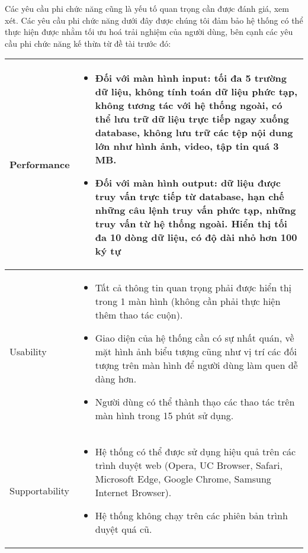 Các yêu cầu phi chức năng cũng là yếu tố quan trọng cần được đánh giá, xem xét.
Các yêu cầu phi chức năng dưới đây được chúng tôi đảm bảo hệ thống có thể thực
hiện được nhằm tối ưu hoá trải nghiệm của người dùng, bên cạnh các yêu cầu phi
chức năng kế thừa từ đề tài trước đó:
\begin{center}
    \begin{tabular}{ |m{3cm}|m{10cm}|}
        \hline
        Performance    & \begin{itemize}
                             \item Đối với màn hình input: tối đa 5 trường dữ liệu, không tính toán dữ liệu phức tạp, không tương tác với hệ thống ngoài, có thể lưu trữ dữ liệu trực
                                   tiếp ngay xuống database, không lưu trữ các tệp nội dung lớn như hình ảnh, video, tập tin quá 3 MB.
                             \item Đối với màn hình output: dữ liệu được truy vấn trực tiếp từ database, hạn chế những câu lệnh truy vấn phức tạp, những truy vấn từ hệ thống ngoài.
                                   Hiển thị tối đa 10 dòng dữ liệu, có độ dài nhỏ hơn 100 ký tự
                         \end{itemize} \\
        \hline
        Usability      & \begin{itemize}
                             \item Tất cả thông tin quan trọng phải được hiển thị trong 1 màn hình (không cần phải
                                   thực hiện thêm thao tác cuộn).
                             \item Giao diện của hệ thống cần có sự nhất quán, về mặt hình ảnh biểu tượng cũng như
                                   vị trí các đối tượng trên màn hình để người dùng làm quen dễ dàng hơn.
                             \item Người dùng có thể thành thạo các thao tác trên màn hình trong 15 phút sử dụng.
                         \end{itemize}                                                                    \\
        \hline
        Supportability & \begin{itemize}
                             \item Hệ thống có thể được sử dụng hiệu quả trên các trình duyệt web (Opera, UC
                                   Browser, Safari, Microsoft Edge, Google Chrome, Samsung Internet Browser).
                             \item Hệ thống không chạy trên các phiên bản trình duyệt quá cũ.

\end{itemize}
\end{tabular}
\end{center}
